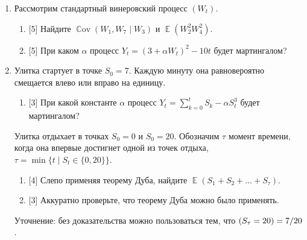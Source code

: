 \documentclass[12pt]{article}
\DeclareMathOperator{\Cov}{\mathbb{C}ov}
\DeclareMathOperator{\Var}{\mathbb{V}ar}
\let\P\relax
\DeclareMathOperator{\P}{\mathbb{P}}
\DeclareMathOperator{\E}{\mathbb{E}}
\newcommand \NN{\mathbb{N}}
\newcommand{\dGamma}{\mathrm{Gamma}}
\begin{document}
\begin{enumerate}
    \item 
    Рассмотрим стандартный винеровский процесс $(W_t)$.
    \begin{enumerate}
        \item {[5]} Найдите $\Cov(W_1, W_7 \mid W_3)$ и $\E(W_2^2 W_4^2)$.
        \item {[5]} При каком $\alpha$ процесс $Y_t = (3 + \alpha W_t)^2 - 10t$ будет мартингалом?
    \end{enumerate}
    
    \item Улитка стартует в точке $S_0 = 7$. 
    Каждую минуту она равновероятно смещается влево или вправо на единицу. 
    \begin{enumerate}
        \item {[3]} При какой константе $\alpha$ процесс $Y_t = \sum_{k=0}^t S_k - \alpha S_t^3$ будет мартингалом?
    \end{enumerate}
    Улитка отдыхает в точках $S_0 = 0$ и $S_0 = 20$.
    Обозначим $\tau$ момент времени, когда она впервые достигнет одной из точек отдыха, $\tau = \min\{t \mid S_t \in\{0, 20\}\}$.
    \begin{enumerate}[resume]
        \item {[4]} Слепо применяя теорему Дуба, найдите $\E(S_1 + S_2 +\dots + S_\tau)$.
        \item {[3]} Аккуратно проверьте, что теорему Дуба можно было применять. 
    \end{enumerate}

    Уточнение: без доказательства можно пользоваться тем, что $\P(S_\tau = 20) = 7/20$.



    


\end{enumerate}
\end{document}
